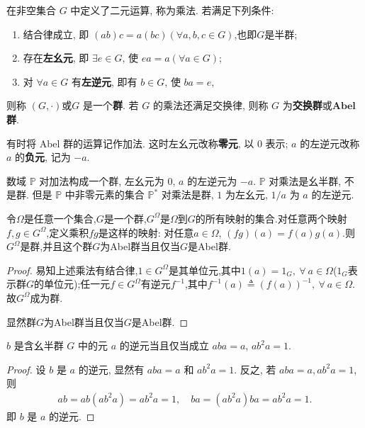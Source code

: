\documentclass[../../main.tex]{subfiles}%
\begin{document}
\begin{definition}[群]
在非空集合 \( G \) 中定义了二元运算, 称为乘法. 若满足下列条件:
\begin{enumerate}[(1)]
\item 结合律成立, 即 \( (ab)c = a(bc) (\forall a,b,c \in G) \),也即$G$是半群;

\item 存在\textbf{左幺元}, 即 \( \exists e \in G \), 使 \( ea = a (\forall a \in G) \);

\item 对 \( \forall a \in G \) 有\textbf{左逆元}, 即有 \( b \in G \), 使 \( ba = e \),
\end{enumerate}
则称 $(G,\cdot)$或\( G \) 是一个\textbf{群}. 若 \( G \) 的乘法还满足交换律, 则称 \( G \) 为\textbf{交换群}或$\mathbf{Abel}$\textbf{群}.

有时将 Abel 群的运算记作加法. 这时左幺元改称\textbf{零元}, 以 $0$ 表示; $a$ 的左逆元改称 $a$ 的\textbf{负元}, 记为 $-a$.
\end{definition}
\begin{remark}
数域 $\mathbb{P}$ 对加法构成一个群, 左幺元为 $0$, $a$ 的左逆元为 $-a$. $\mathbb{P}$ 对乘法是幺半群, 不是群. 但是 $\mathbb{P}$ 中非零元素的集合 $\mathbb{P}^*$ 对乘法是群, $1$ 为左幺元, $1/a$ 为 $a$ 的左逆元.
\end{remark}

\begin{example}
令$\Omega$是任意一个集合,$G$是一个群,$G^\Omega$是$\Omega$到$G$的所有映射的集合.对任意两个映射$f,g \in G^\Omega$,定义乘积$fg$是这样的映射: 对任意$a \in \Omega$, $(fg)(a) = f(a)g(a)$.则$G^\Omega$是群,并且这个群$G$为Abel群当且仅当$G$是Abel群.
\end{example}
\begin{proof}
易知上述乘法有结合律,$1 \in G^\Omega$是其单位元,其中$1(a) = 1_G,\ \forall\ a \in \Omega$($1_G$表示群$G$的单位元);任一元$f \in G^\Omega$有逆元$f^{-1}$,其中$f^{-1}(a) \triangleq  (f(a))^{-1},\ \forall\ a \in \Omega$.故$G^\Omega$成为群.

显然群$G$为Abel群当且仅当$G$是Abel群.
\end{proof}

\begin{example}
$b$ 是含幺半群 $G$ 中的元 $a$ 的逆元当且仅当成立 $aba = a$, $ab^2a = 1$.
\end{example}
\begin{proof}
设 $b$ 是 $a$ 的逆元, 显然有 $aba = a$ 和 $ab^2a = 1$. 反之, 若 $aba = a, ab^2a = 1$, 则
\begin{align*}
ab = ab(ab^2a) = ab^2a = 1, \quad ba = (ab^2a)ba = ab^2a = 1.
\end{align*}
即 $b$ 是 $a$ 的逆元.
\end{proof}
\end{document}
